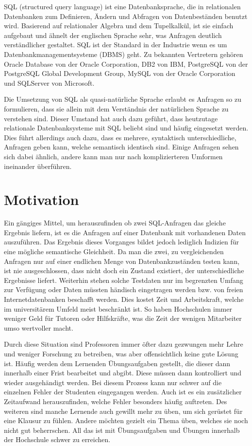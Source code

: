 
SQL (structured query language) ist eine Datenbanksprache, die in relationalen Datenbanken zum Definieren, Ändern und Abfragen von Datenbeständen benutzt wird. Basierend auf relationaler Algebra und dem Tupelkalkül, ist sie einfach aufgebaut und ähnelt der englischen Sprache sehr, was Anfragen deutlich verständlicher gestaltet. SQL ist der Standard in der Industrie wenn es um Datenbankmanagementsysteme (DBMS) geht. Zu bekannten Vertretern gehören Oracle Database von der Oracle Corporation, DB2 von IBM, PostgreSQL von der PostgreSQL Global Development Group, MySQL von der Oracle Corporation und SQLServer von Microsoft.

Die Umsetzung von SQL als quasi-natürliche Sprache erlaubt es Anfragen so zu formulieren, dass sie allein mit dem Verständnis der natürlichen Sprache zu verstehen sind. Dieser Umstand hat auch dazu geführt, dass heutzutage relationale Datenbanksysteme mit SQL beliebt sind und häufig eingesetzt werden. 
Dies führt allerdings auch dazu, dass es mehrere, syntaktisch unterschiedliche, Anfragen geben kann, welche semantisch identisch sind. Einige Anfragen sehen sich dabei ähnlich, andere kann man nur nach komplizierteren Umformen ineinander überführen. 

\section{Motivation}

Ein gängiges Mittel, um herauszufinden ob zwei SQL-Anfragen das gleiche Ergebnis liefern, ist es die Anfragen auf einer Datenbank mit vorhandenen Daten auszuführen. Das Ergebnis dieses Vorganges bildet jedoch lediglich Indizien für eine mögliche semantische Gleichheit. Da man die zwei, zu vergleichenden Anfragen nur auf einer endlichen Menge von Datenbankzuständen testen kann, ist nie ausgeschlossen, dass nicht doch ein Zustand existiert, der unterschiedliche Ergebnisse liefert. Weiterhin stehen solche Testdaten nur im begrenzten Umfang zur Verfügung oder Daten müssten händisch eingetragen werden bzw. von freien Internetdatenbanken beschafft werden. Dies kostet Zeit und Arbeitskraft, welche im universitärem Umfeld meist beschränkt ist. So haben Hochschulen immer weniger Geld für Tutoren oder Hilfskräfte, was die Zeit der wenigen Mitarbeiter umso wertvoller macht.

Durch diese Situation sind Professoren immer öfter dazu gezwungen mehr Lehre und weniger Forschung zu betreiben, was aber offensichtlich keine gute Lösung ist. Häufig werden dem Lernenden Übungsaufgaben gestellt, die dieser dann innerhalb einer Frist bearbeitet und abgibt. Diese müssen dann kontrolliert und wieder ausgehändigt werden. Bei diesem Prozess kann nur schwer auf die einzelnen Fehler der Studenten eingegangen werden. Auch ist es ein zusätzlicher Zeitaufwand herauszufinden, welche Fehler besonders häufig auftreten. Des weiteren sind manche Lernende auch gewillt mehr zu üben, um sich gerüstet für eine Klausur zu fühlen. Andere möchten gezielt ein Thema üben, welches sie noch nicht gut beherrschen. All das ist mit Übungsaufgaben und Übungen innerhalb der Hochschule schwer zu erreichen. 

